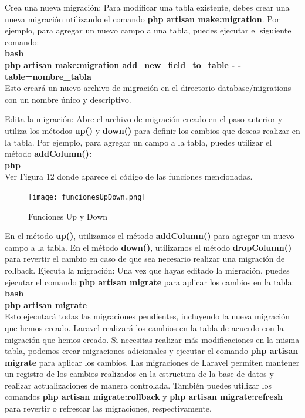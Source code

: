 \documentclass{article}
\begin{document}
Crea una nueva migración: Para modificar una tabla existente, debes crear una nueva migración utilizando el comando \textbf{php artisan make:migration}. Por ejemplo, para agregar un nuevo campo a una tabla, puedes ejecutar el siguiente comando:\\

\textbf{bash}\\

\textbf{php artisan make:migration add\_new\_field\_to\_table - -table=nombre\_tabla}\\

Esto creará un nuevo archivo de migración en el directorio database/migrations con un nombre único y descriptivo.

Edita la migración: Abre el archivo de migración creado en el paso anterior y utiliza los métodos \textbf{up()} y \textbf{down()} para definir los cambios que deseas realizar en la tabla. Por ejemplo, para agregar un campo a la tabla, puedes utilizar el método \textbf{addColumn():}\\

\textbf{php}\\

Ver Figura 12 donde aparece el código de las funciones mencionadas.
\begin{figure}[!]
\centering
\texttt{[image: funcionesUpDown.png]}
\caption{\label{fig:012} Funciones Up y Down}
\end{figure}

En el método \textbf{up()}, utilizamos el método \textbf{addColumn()} para agregar un nuevo campo a la tabla. En el método \textbf{down()}, utilizamos el método \textbf{dropColumn()} para revertir el cambio en caso de que sea necesario realizar una migración de rollback.
Ejecuta la migración: Una vez que hayas editado la migración, puedes ejecutar el comando \textbf{php artisan migrate} para aplicar los cambios en la tabla:\\

\textbf{bash}\\

\textbf{php artisan migrate}\\

Esto ejecutará todas las migraciones pendientes, incluyendo la nueva migración que hemos creado.
Laravel realizará los cambios en la tabla de acuerdo con la migración que hemos creado. Si necesitas realizar más modificaciones en la misma tabla, podemos crear migraciones adicionales y ejecutar el comando \textbf{php artisan migrate} para aplicar los cambios.
Las migraciones de Laravel permiten mantener un registro de los cambios realizados en la estructura de la base de datos y realizar actualizaciones de manera controlada. También puedes utilizar los comandos \textbf{php artisan migrate:rollback} y \textbf{php artisan migrate:refresh} para revertir o refrescar las migraciones, respectivamente.
\end{document}
